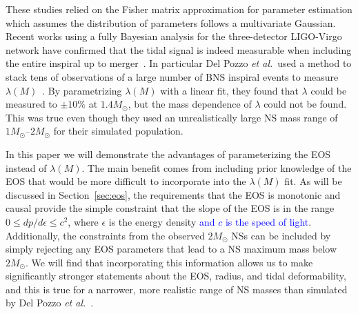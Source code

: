 \documentclass[twocolumn,prd,amssymb,aps,nofootinbib,showpacs,epsf]{revtex4}
\newcommand\les[2]{\textcolor{blue}{{#1}\sout{#2}}}
\begin{document}
These studies relied on the Fisher matrix approximation for parameter estimation which assumes the distribution of parameters follows a multivariate Gaussian. Recent works using a fully Bayesian analysis for the three-detector LIGO-Virgo network have confirmed that the tidal signal is indeed measurable when including the entire inspiral up to merger~\cite{DelPozzoLiAgathos2013, WadeCreightonOchsner2014}. In particular Del Pozzo {\it et al.}\ used a method to stack tens of observations of a large number of BNS inspiral events to measure $\lambda(M)$~\cite{DelPozzoLiAgathos2013}. By parametrizing $\lambda(M)$ with a linear fit, they found that $\lambda$ could be measured to $\pm 10\%$ at $1.4M_\odot$, but the mass dependence of $\lambda$ could not be found. This was true even though they used an unrealistically large NS mass range of $1M_\odot$--$2M_\odot$ for their simulated population.

In this paper we will demonstrate the advantages of parameterizing the EOS instead of $\lambda(M)$. The main benefit comes from including prior knowledge of the EOS that would be more difficult to incorporate into the $\lambda(M)$ fit. As will be discussed in Section~\ref{sec:eos}, the requirements that the EOS is monotonic and causal provide the simple constraint that the slope of the EOS is in the range $0 \le dp/d\epsilon \le c^2$, where $\epsilon$ is the energy density \les{and $c$ is the speed of light}{}. Additionally, the constraints from the observed $2M_\odot$ NSs can be included by simply rejecting any EOS parameters that lead to a NS maximum mass below $2M_\odot$. We will find that incorporating this information allows us to make significantly stronger statements about the EOS, radius, and tidal deformability, and this is true for a narrower, more realistic range of NS masses than simulated by Del Pozzo {\it et al.}~\cite{DelPozzoLiAgathos2013}.

\end{document}
